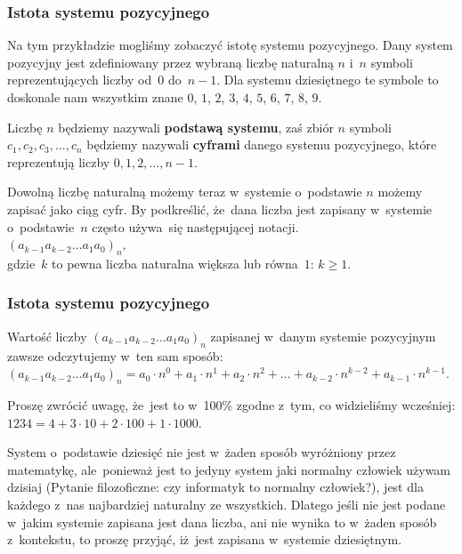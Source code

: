 \documentclass[10pt,t]{beamer}
\begin{document}
\begin{frame}
  \frametitle{Istota systemu pozycyjnego}


  Na tym przykładzie mogliśmy zobaczyć istotę systemu pozycyjnego. Dany
  system pozycyjny jest zdefiniowany przez wybraną liczbę naturalną $n$
  i~$n$ symboli reprezentujących liczby od~$0$ do~$n - 1$. Dla systemu
  dziesiętnego te symbole to doskonale nam wszystkim znane $0$, $1$, $2$,
  $3$, $4$, $5$, $6$, $7$, $8$, $9$.

  Liczbę $n$ będziemy nazywali \textbf{podstawą systemu}, zaś zbiór $n$
  symboli $c_{ 1 }, c_{ 2 }, c_{ 3 }, \ldots, c_{ n }$ będziemy nazywali
  \textbf{cyframi}
  danego systemu pozycyjnego, które reprezentują liczby $0, 1, 2, \ldots, n - 1$.

  Dowolną liczbę naturalną możemy teraz w~systemie o~podstawie $n$ możemy
  zapisać jako ciąg cyfr. By podkreślić, że~dana liczba jest zapisany
  w~systemie o~podstawie~$n$ często używa~się następującej notacji. \\
  $\displaystyle
  ( a_{ k - 1 } a_{ k - 2 } \ldots a_{ 1 } a_{ 0 } )_{ n },$ \\
  gdzie~$k$ to pewna liczba naturalna większa lub równa~$1$: $k \geq 1$.

\end{frame}





\begin{frame}
  \frametitle{Istota systemu pozycyjnego}


  Wartość liczby $( a_{ k - 1 } a_{ k - 2 } \ldots a_{ 1 } a_{ 0 } )_{ n }$ zapisanej
  w~danym systemie pozycyjnym zawsze odczytujemy w~ten sam sposób: \\
  $\displaystyle
  ( a_{ k - 1 } a_{ k - 2 } \ldots a_{ 1 } a_{ 0 } )_{ n } =
  a_{ 0 } \cdot n^{ 0 } + a_{ 1 } \cdot n^{ 1 } + a_{ 2 } \cdot n^{ 2 } + \ldots +
  a_{ k - 2 } \cdot n^{ k - 2 } + a_{ k - 1 } \cdot n^{ k - 1 }.$

  Proszę zwrócić uwagę, że~jest to w~100\% zgodne z~tym, co widzieliśmy
  wcześniej: $1234 = 4 + 3 \cdot 10 + 2 \cdot 100 + 1 \cdot 1000$.

  System o~podstawie dziesięć nie jest w~żaden sposób wyróżniony przez
  matematykę, ale~ponieważ jest to jedyny system jaki normalny człowiek
  używam dzisiaj (Pytanie filozoficzne: czy informatyk to normalny
  człowiek?), jest dla każdego z~nas najbardziej naturalny ze
  wszystkich. Dlatego jeśli nie jest podane w~jakim systemie zapisana
  jest dana liczba, ani nie wynika to w~żaden sposób z~kontekstu, to
  proszę przyjąć, iż~jest zapisana w~systemie dziesiętnym.

\end{frame}
\end{document}
